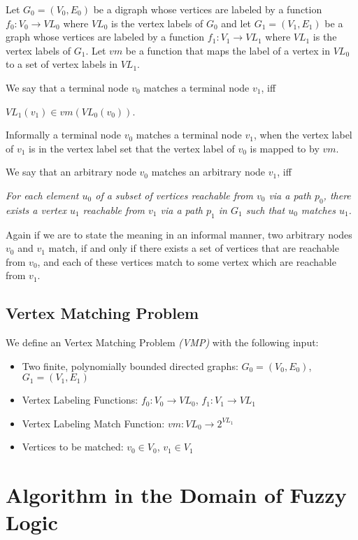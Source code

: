 \documentclass[egilmezThesis.tex]{subfiles}
\begin{document}
Let $G_0 = (V_0,E_0)$ be a digraph whose vertices are labeled by a function $f_0 : V_0 \to VL_0$ where $VL_0$ is the vertex labels of $G_0$ and let $G_1 = (V_1,E_1)$ be a graph whose vertices are labeled by a function $f_1 : V_1 \to VL_1$ where $VL_1$ is the vertex labels of $G_1$. Let $vm$ be a function that maps the label of a vertex in $VL_0$ to a set of vertex labels in $VL_1$.

We say that a  terminal node $v_0$ matches a terminal node $v_1$, iff \\ \begin{center} $VL_1(v_1) \in vm(VL_0(v_0))$. \end{center}
Informally a  terminal node $v_0$ matches a terminal node $v_1$, when the vertex label of $v_1$ is in the vertex label set that the vertex label of $v_0$ is mapped to by $vm$.

We say that an arbitrary node $v_0$ matches an arbitrary node $v_1$, iff \begin{center}
\textit{For each element  $u_0$ of a subset of vertices reachable from $v_0$ via a path $p_0$, there exists a vertex $u_1$ reachable from $v_1$ via a path $p_1$ in $G_1$ such that $u_0$ matches $u_1$.} \end{center}

Again if we are to state the meaning in an informal manner, two arbitrary nodes $v_0$ and $v_1$ match, if and only if there exists a set of vertices that are reachable from $v_0$, and each of these vertices match to some vertex which are reachable from $v_1$.

\subsection{Vertex Matching Problem}
\label{MP}
We define an Vertex Matching Problem \emph{(VMP)} with the following input:
\begin{itemize}
	\item Two finite, polynomially bounded directed graphs: $G_0=(V_0, E_0)$, $G_1=(V_1, E_1)$
	\item Vertex Labeling Functions: $f_0: V_0 \rightarrow VL_0$, $f_1: V_1 \rightarrow VL_1$
  \item  Vertex Labeling Match Function: $vm: VL_0 \rightarrow 2^{VL_1}$
  \item Vertices to be matched: $v_0 \in V_0$, $v_1 \in V_1$
 \end{itemize}

\section{Algorithm in the Domain of Fuzzy Logic}
\label{algFL}
\end{document}
